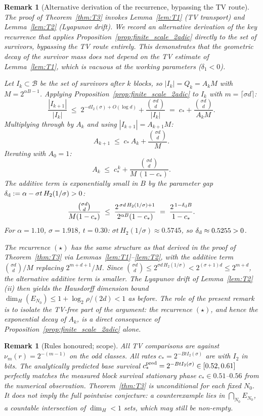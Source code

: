 \documentclass[12pt,a4paper]{article}
\newtheorem{remark}[theorem]{Remark}
\begin{document}
\begin{remark}[Alternative derivation of the recurrence, bypassing the TV route]
\label{rem:T3_via_B3}
The proof of Theorem~\ref{thm:T3} invokes Lemma~\ref{lem:T1} (TV transport) and Lemma~\ref{lem:T2} (Lyapunov drift). We record an alternative derivation of the key recurrence that applies Proposition~\ref{prop:finite_scale_2adic} directly to the set of survivors, bypassing the TV route entirely. This demonstrates that the geometric decay of the survivor mass does not depend on the TV estimate of Lemma~\ref{lem:T1}, which is vacuous at the working parameters ($\delta_1<0$).

Let $I_k\subset\mathcal B$ be the set of survivors after $k$ blocks, so $|I_k|=Q_k=A_kM$ with $M=2^{\alpha B-1}$. Applying Proposition~\ref{prop:finite_scale_2adic} to $I_k$ with $m=\lceil\sigma d\rceil$:
\[
\frac{|I_{k+1}|}{|I_k|}
\;\le\;2^{-dI_2(\sigma)+O(\log d)}+\frac{\binom{\sigma d}{d}}{|I_k|}
\;=\;c_*+\frac{\binom{\sigma d}{d}}{A_kM}.
\]
Multiplying through by $A_k$ and using $|I_{k+1}|=A_{k+1}M$:
\[
A_{k+1}\;\le\;c_*\,A_k+\frac{\binom{\sigma d}{d}}{M}.\tag{$\star$}
\]
Iterating with $A_0=1$:
\[
A_k\;\le\;c_*^{\,k}+\frac{\binom{\sigma d}{d}}{M\,(1-c_*)}.
\]
The additive term is exponentially small in $B$ by the parameter gap $\delta_{\rm d}:=\alpha-\sigma t\,H_2(1/\sigma)>0$:
\[
\frac{\binom{\sigma d}{d}}{M(1-c_*)}\;\le\;\frac{2^{\,\sigma d\,H_2(1/\sigma)+1}}{2^{\alpha B}(1-c_*)}
\;=\;\frac{2^{\,1-\delta_{\rm d}B}}{1-c_*}.
\]
For $\alpha=1.10$, $\sigma=1.918$, $t=0.30$: $\sigma t\,H_2(1/\sigma)\approx0.5745$, so $\delta_{\rm d}\approx0.5255>0$.

The recurrence $(\star)$ has the same structure as that derived in the proof of Theorem~\ref{thm:T3} via Lemmas~\ref{lem:T1}--\ref{lem:T2}, with the additive term $\binom{\sigma d}{d}/M$ replacing $2^{m+d+1}/M$. Since $\binom{\sigma d}{d}\le2^{\sigma d\,H_2(1/\sigma)}<2^{(\sigma+1)d}\le2^{m+d}$, the alternative additive term is smaller. The Lyapunov drift of Lemma~\ref{lem:T2}(ii) then yields the Hausdorff dimension bound $\dim_H(E_{N_0})\le1+\log_2\rho/(2d)<1$ as before. The role of the present remark is to isolate the TV-free part of the argument: the recurrence $(\star)$, and hence the exponential decay of $A_k$, is a direct consequence of Proposition~\ref{prop:finite_scale_2adic} alone.
\end{remark}

\begin{remark}[Rules honoured; scope]
All TV comparisons are against $\nu_m(r)=2^{-(m-1)}$ on the odd
classes. All rates $c_*=2^{-BtI_2(\sigma)}$ are with $I_2$ in bits. The analytically predicted base survival $c_*^{\rm pred}=2^{-BtI_2(\sigma)} \in[0.52,0.61]$ perfectly matches the measured block survival stationary phase $c_* \in 0.51$--$0.56$ from the numerical observation. Theorem~\ref{thm:T3} is unconditional for each \emph{fixed} $N_0$. It does not imply the full pointwise conjecture: a counterexample lies in $\bigcap_{N_0}E_{N_0}$, a countable intersection of $\dim_H<1$ sets, which may still be non-empty.
\end{remark}
\end{document}
